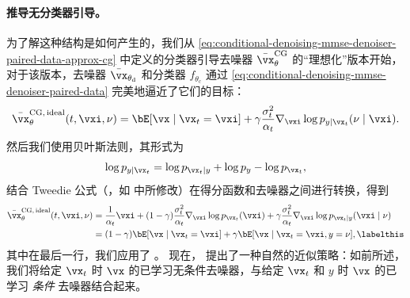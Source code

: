 \documentclass[../../book-main_zh.tex]{subfiles}
\begin{document}
\paragraph{推导无分类器引导。} 为了解这种结构是如何产生的，我们从 \eqref{eq:conditional-denoising-mmse-denoiser-paired-data-approx-cg} 中定义的分类器引导去噪器 $\bar{\vx}_{\theta}^{\mathrm{CG}}$ 的“理想化”版本开始，对于该版本，去噪器 $\bar{\vx}_{\theta_{\mathrm{d}}}$ 和分类器 $f_{\theta_{\mathrm{c}}}$ 通过 \eqref{eq:conditional-denoising-mmse-denoiser-paired-data} 完美地逼近了它们的目标：
\begin{equation}\label{eq:conditional-denoising-mmse-denoiser-paired-data-exact-cg}
    \bar{\vx}_{\theta}^{\mathrm{CG,\,ideal}}(t, \vxi, \nu)
    =
    \bE[\vx \mid \vx_t=\vxi]
    + \gamma\frac{\sigma_t^2}{\alpha_t}
    \nabla_{\vxi}\log p_{y \mid \vx_t}(\nu\mid \vxi).
\end{equation}
然后我们使用贝叶斯法则，其形式为
\begin{equation}
    \log p_{y \mid \vx_t}
    =
    \log p_{\vx_t \mid y} + \log p_{y} - \log p_{\vx_t},
\end{equation}
结合 Tweedie 公式（，如  中所修改）在得分函数和去噪器之间进行转换，得到
\begin{align*}
    \bar{\vx}_{\theta}^{\mathrm{CG,\,ideal}}(t, \vxi, \nu)
    &=
    \frac{1}{\alpha_t} \vxi
    + (1-\gamma) \frac{\sigma_t^2}{\alpha_t}
    \nabla_{\vxi}\log p_{\vx_t}(\vxi)
    + \gamma \frac{\sigma_t^2}{\alpha_t}
    \nabla_{\vxi}\log p_{\vx_t \mid y}(\vxi \mid \nu)
    \\
    &=
    (1 - \gamma) \bE[\vx \mid \vx_t=\vxi]
    +
    \gamma \bE[\vx \mid \vx_t=\vxi, y=\nu],
    \labelthis\label{eq:ideal-cfg-denoiser}
\end{align*}
其中在最后一行，我们应用了 。
现在， 提出了一种自然的近似策略：如前所述，我们将给定 $\vx_t$ 时 $\vx$ 的已学习无条件去噪器，与给定 $\vx_t$ 和 $y$ 时 $\vx$ 的已学习 \textit{条件} 去噪器结合起来。
\end{document}
